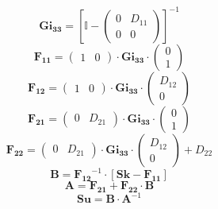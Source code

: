 \[ \mathbf{Gi_{33}} = \left[\mathbb{I} -\left(\begin{smallmatrix} 0 &
D_{11} \\ 0 & 0 \end{smallmatrix}\right)\right]^{-1} \]
\[ \mathbf{F_{11}} = \left(\begin{smallmatrix} 1 & 0
\end{smallmatrix}\right) \cdot\mathbf{Gi_{33}}\cdot
\left(\begin{smallmatrix} 0 \\ 1 \end{smallmatrix}\right) \]
\[ \mathbf{F_{12}} = \left(\begin{smallmatrix} 1 & 0
\end{smallmatrix}\right) \cdot\mathbf{Gi_{33}}\cdot
\left(\begin{smallmatrix} D_{12} \\ 0 \end{smallmatrix}\right) \]
\[ \mathbf{F_{21}} = \left(\begin{smallmatrix} 0 & D_{21}
\end{smallmatrix}\right) \cdot\mathbf{Gi_{33}}\cdot
\left(\begin{smallmatrix} 0 \\ 1 \end{smallmatrix}\right) \]
\[ \mathbf{F_{22}} = \left(\begin{smallmatrix} 0 & D_{21}
\end{smallmatrix}\right) \cdot\mathbf{Gi_{33}}\cdot
\left(\begin{smallmatrix} D_{12} \\ 0 \end{smallmatrix}\right) +
D_{22} \]
\[ \mathbf{B}=\mathbf{F_{12}}^{-1}\cdot\left[ \mathbf{Sk} -
\mathbf{F_{11}} \right]  \]
\[ \mathbf{A}=\mathbf{F_{21}}+ \mathbf{F_{22}}\cdot\mathbf{B} \]
\[ \mathbf{Su} = \mathbf{B} \cdot \mathbf{A}^{-1} \]
